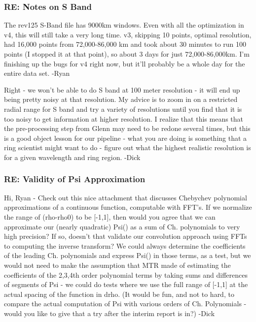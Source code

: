 \documentclass[crop=false,class=article,oneside]{standalone}
\begin{document}
\subsubsection{\footnotesize RE: Notes on S Band}
The rev125 S-Band file has 9000km windows. Even with all the optimization in v4, this will still take a very long time. v3, skipping 10 points, optimal resolution, had 16,000 points from 72,000-86,000 km and took about 30 minutes to run 100 points (I stopped it at that point), so about 3 days for just 72,000-86,000km. I'm finishing up the bugs for v4 right now, but it'll probably be a whole day for the entire data set. -Ryan\par
Right - we won't be able to do S band at 100 meter resolution - it will end up being pretty noisy at that resolution. My advice is to zoom in on a restricted radial range for S band and try a variety of resolutions until you find that it is too noisy to get information at higher resolution. I realize that this means that the pre-processing step from Glenn may need to be redone several times, but this is a good object lesson for our pipeline - what you are doing is something that a ring scientist might want to do - figure out what the highest realistic resolution is for a given wavelength and ring region. -Dick
\subsubsection{\footnotesize RE: Validity of Psi Approximation}
Hi, Ryan - Check out this nice attachment that discusses Chebychev polynomial approximations of a continuous function, computable with FFT's. If we normalize the range of (rho-rho0) to be [-1,1], then would you agree that we can approximate our (nearly quadratic) Psi() as a sum of Ch. polynomials to very high precision? If so, doesn't that validate our convolution approach using FFTs to computing the inverse transform? We could always determine the coefficients of the leading Ch. polynomials and express Psi() in those terms, as a test, but we would not need to make the assumption that MTR made of estimating the coefficients of the 2,3,4th order polynomial terms by taking sums and differences of segments of Psi - we could do tests where we use the full range of [-1,1] at the actual spacing of the function in drho.
(It would be fun, and not to hard, to compare the actual computation of Psi with various orders of Ch. Polynomials - would you like to give that a try after the interim report is in?) -Dick
\end{document}
